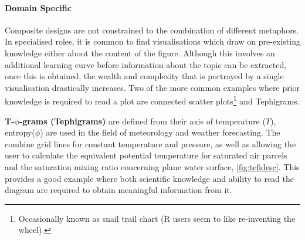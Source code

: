 \paragraph*{Domain Specific}




Composite designs are not constrained to the combination of different metaphors. In specialised roles, it is common to find visualisations which draw on pre-existing knowledge either about the content of the figure. Although this involves an additional learning curve before information about the topic can be extracted, once this is obtained, the wealth and complexity that is portrayed by a single visualisation drastically increases. Two of the more common examples where prior knowledge is required to read a plot are connected scatter plots\footnote{ Occasionally known as snail trail chart (R users seem to like re-inventing the wheel). } and Tephigrams. 

\textbf{T-$\phi$-grams (Tephigrams)} are defined from their axis of temperature ($T$), entropy($\phi$) are used in the field of meteorology and weather forecasting. The combine grid lines for constant temperature and pressure, as well as allowing the user to calculate the equivalent potential temperature for saturated air parcels and the saturation mixing ratio concerning plane water surface, \autoref{fig:tefidesc}. This provides a good example where both scientific knowledge and ability to read the diagram are required to obtain meaningful information from it. 

